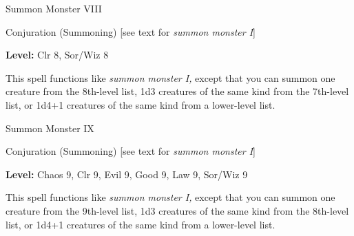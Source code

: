 \documentclass{article}
\begin{document}
\vspace{12pt}
Summon Monster VIII

Conjuration (Summoning) [see text for \textit{summon monster I}]

\textbf{Level:} Clr 8, Sor/Wiz 8

This spell functions like \textit{summon monster I, }except that you can summon 
one creature from the 8th-level list, 1d3 creatures of the same kind from the 7th-level 
list, or 1d4+1 creatures of the same kind from a lower-level list.

\vspace{12pt}
Summon Monster IX

Conjuration (Summoning) [see text for \textit{summon monster I}]

\textbf{Level:} Chaos 9, Clr 9, Evil 9, Good 9, Law 9, Sor/Wiz 9

This spell functions like \textit{summon monster I, }except that you can summon 
one creature from the 9th-level list, 1d3 creatures of the same kind from the 8th-level 
list, or 1d4+1 creatures of the same kind from a lower-level list.
\end{document}
